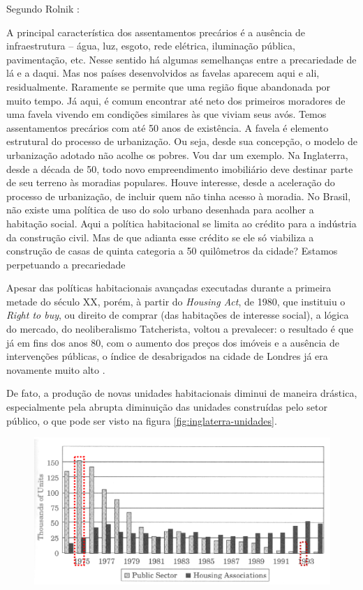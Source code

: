 \documentclass[
	12pt,				%
	oneside,			%
	a4paper,			%
	chapter=TITLE,		%
	section=TITLE,		%
	english,			%
	brazil				%
	]{abntex2}
\begin{document}
\begin{refsection}
Segundo Rolnik \autocite[\emph{apud}][165-166]{jung2018}:
\begin{citacao}
A principal característica dos assentamentos precários é a ausência de
infraestrutura – água, luz, esgoto, rede elétrica, iluminação pública,
pavimentação, etc. Nesse sentido há algumas semelhanças entre a precariedade de
lá e a daqui. Mas nos países desenvolvidos as favelas aparecem aqui e ali,
residualmente. Raramente se permite que uma região fique abandonada por muito
tempo. Já aqui, é comum encontrar até neto dos primeiros moradores de uma favela
vivendo em condições similares às que viviam seus avós. Temos assentamentos
precários com até 50 anos de existência. A favela é elemento estrutural do
processo de urbanização. Ou seja, desde sua concepção, o modelo de urbanização
adotado não acolhe os pobres. Vou dar um exemplo. Na Inglaterra, desde a década
de 50, todo novo empreendimento imobiliário deve destinar parte de seu terreno
às moradias populares. Houve interesse, desde a aceleração do processo de
urbanização, de incluir quem não tinha acesso à moradia. No Brasil, não existe
uma política de uso do solo urbano desenhada para acolher a habitação social.
Aqui a política habitacional se limita ao crédito para a indústria da construção
civil. Mas de que adianta esse crédito se ele só viabiliza a construção de casas
de quinta categoria a 50 quilômetros da cidade? Estamos perpetuando a
precariedade
\end{citacao}
Apesar das políticas habitacionais avançadas executadas durante a primeira
metade do século XX, porém, à partir do \emph{Housing Act}, de 1980, que instituiu o
\emph{Right to buy}, ou direito de comprar (das habitações de interesse social), a
lógica do mercado, do neoliberalismo Tatcherista, voltou a prevalecer: o
resultado é que já em fins dos anos 80, com o aumento dos preços dos imóveis e a
ausência de intervenções públicas, o índice de desabrigados na cidade de Londres
já era novamente muito alto \autocite[72]{jung2018}.

De fato, a produção de novas unidades habitacionais diminui de maneira drástica,
especialmente pela abrupta diminuição das unidades construídas pelo setor
público, o que pode ser visto na figura \ref{fig:inglaterra-unidades}.
\begin{figure}[H]

{\centering \includegraphics[width=0.7\linewidth]{images/inglaterra-unidades} 

}
\end{figure}
\end{refsection}
\end{document}
